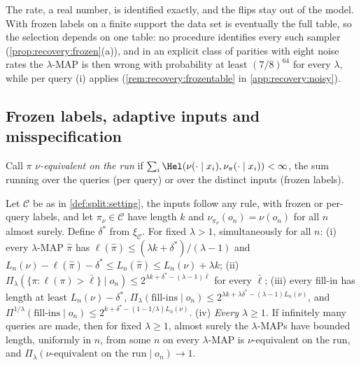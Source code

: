 The rate, a real number, is identified exactly, and the flips stay out of the model. With frozen labels on a finite support the data set is eventually the full table, so the selection depends on one table: no procedure identifies every such sampler (\cref{prop:recovery:frozen}(a)), and in an explicit class of parities with eight noise rates the $\lambda$-MAP is then wrong with probability at least $(7/8)^{64}$ for every $\lambda$, while per query (i) applies (\cref{rem:recovery:frozentable} in \cref{app:recovery:noisy}).

\subsection{Frozen labels, adaptive inputs and misspecification}\label{sec:split:private}

Call $\pi$ \emph{$\nu$-equivalent on the run} if $\sum_i\Hel(\nu(\cdot\mid x_i),\nu_\pi(\cdot\mid x_i))<\infty$, the sum running over the queries (per query) or over the distinct inputs (frozen labels).

\begin{theorem}\label{thm:split:private}
Let $\mathcal C$ be as in \cref{def:split:setting}, the inputs follow any rule, with frozen or per-query labels, and let $\pi_\nu\in\mathcal C$ have length $k$ and $\nu_{\pi_\nu}(o_n)=\nu(o_n)$ for all $n$ almost surely. Define $\delta^*$ from $\xi_{\mathcal C}$. For fixed $\lambda>1$, simultaneously for all $n$:
(i) every $\lambda$-MAP $\hat\pi$ has $\ell(\hat\pi)\le(\lambda k+\delta^*)/(\lambda-1)$ and $L_n(\nu)-\ell(\hat\pi)-\delta^*\le L_n(\hat\pi)\le L_n(\nu)+\lambda k$;
(ii) $\Pi_\lambda(\{\pi:\ell(\pi)>\bar\ell\}\mid o_n)\le2^{\lambda k+\delta^*-(\lambda-1)\bar\ell}$ for every $\bar\ell$;
(iii) every fill-in has length at least $L_n(\nu)-\delta^*$, $\Pi_\lambda(\text{fill-ins}\mid o_n)\le2^{\lambda k+\lambda\delta^*-(\lambda-1)L_n(\nu)}$, and $\Pi^{1/\lambda}(\text{fill-ins}\mid o_n)\le2^{k+\delta^*-(1-1/\lambda)L_n(\nu)}$.
(iv) \emph{Every $\lambda\ge1$.} If infinitely many queries are made, then for fixed $\lambda\ge1$, almost surely the $\lambda$-MAPs have bounded length, uniformly in $n$, from some $n$ on every $\lambda$-MAP is $\nu$-equivalent on the run, and $\Pi_\lambda(\nu\text{-equivalent on the run}\mid o_n)\to1$.
\end{theorem}

